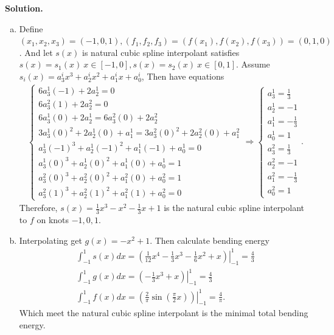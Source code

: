 \documentclass[a4paper]{book}
\newenvironment{solution}%
{\noindent\textbf{Solution.}}%
{\qedhere}
\numberwithin{equation}{chapter}
\theoremstyle{definition}
\begin{document}
\begin{solution}
  \begin{enumerate}[(a)]
  \item Define $(x_1,x_2,x_3) = (-1,0,1), (f_1,f_2,f_3) = (f(x_1),f(x_2),f(x_3)) = (0,1,0)$. And let $s(x)$ is natural cubic spline interpolant satisfies $s(x) = s_1(x)\ x \in [-1,0],s(x) = s_2(x)\ x \in [0,1]$. Assume $s_i(x) = a_3^i x^3 + a_2^i x^2 + a_1^i x + a_0^i $, Then have equations
    \begin{align*}
      \begin{cases}
        6 a_3^1 (-1) + 2 a_2^1 = 0 \\
        6 a_3^2 (1) + 2 a_2^2 = 0 \\
        6 a_3^1 (0) + 2 a_2^1 =  6 a_3^2 (0) + 2 a_2^2 \\
        3 a_3^1 (0)^2 + 2 a_2^1 (0) + a_1^1 =  3 a_3^2 (0)^2 + 2 a_2^2 (0) + a_1^2 \\
        a_3^1 (-1)^3 + a_2^1 (-1)^2 + a_1^1 (-1) + a_0^1 = 0 \\
        a_3^1 (0)^3 + a_2^1 (0)^2 + a_1^1 (0) + a_0^1 = 1 \\
        a_3^2 (0)^3 + a_2^2 (0)^2 + a_1^2 (0) + a_0^2 = 1 \\
        a_3^2 (1)^3 + a_2^2 (1)^2 + a_1^2 (1) + a_0^2 = 0
      \end{cases} \Longrightarrow
      \begin{cases}
        a_3^1 = \frac{1}{3} \\
        a_2^1 = -1\\
        a_1^1 = -\frac{1}{3}\\
        a_0^1 = 1 \\
        a_3^2 = \frac{1}{3}\\
        a_2^2 = -1\\
        a_1^2 = -\frac{1}{3}\\
        a_0^2 = 1 
      \end{cases}.
    \end{align*}
    Therefore, $s(x) = \frac{1}{3}x^3 - x^2 - \frac{1}{3}x + 1$ is the natural cubic spline interpolant to $f$ on knots $-1,0,1$.

  \item Interpolating get $g(x) = -x^2 + 1$. Then calculate bending energy
    \begin{align*}
      \int_{-1}^{1}s(x)dx = \left. (\frac{1}{12}x^4 - \frac{1}{3}x^3 - \frac{1}{6}x^2 + x) \right|_{-1}^{1} = \frac{4}{3} \\
      \int_{-1}^{1}g(x)dx = \left. (-\frac{1}{3}x^3 + x)\right|_{-1}^{1} = \frac{4}{3} \\
      \int_{-1}^{1}f(x)dx = \left. (\frac{2}{\pi} \sin(\frac{\pi}{2}x)) \right|_{-1}^{1} = \frac{4}{\pi}.
    \end{align*}
    Which meet the natural cubic spline interpolant is the minimal total bending energy.
  \end{enumerate}
\end{solution}
\end{document}
